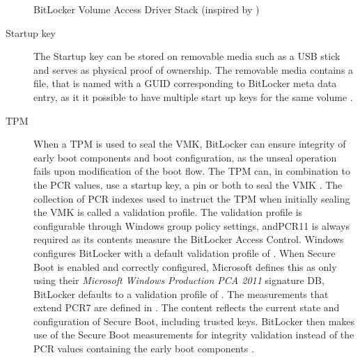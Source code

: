 \begin{figure}[htb]%
    \centering
    
    \caption{BitLocker Volume Access Driver Stack (inspired by \cite[Figure 9-24]{windows-internals-6-part2})}%
    \label{fig:bitlocker-volume-access-driver-stack}%
\end{figure}

\begin{description}
    \item[Startup key] The Startup key can be stored on removable media such as a \ac{USB} stick and serves as physical proof of ownership.
        The removable media contains a  file, that is named with a \ac{GUID} corresponding to BitLocker meta data entry, as it it possible to have multiple start up keys for the same volume \cite[Section 2.6]{bde-format-spec}\cite{microsoft-windows-prepare-your-org}.

    \item[TPM]
        When a \ac{TPM} is used to seal the \ac{VMK}, BitLocker can ensure integrity of early boot components and boot configuration, as the unseal operation fails upon modification of the boot flow.
        The \ac{TPM} can, in combination to the \ac{PCR} values, use a startup key, a pin or both to seal the \ac{VMK} \cite{microsoft-bitlocker-countermeasures}.
        The collection of \ac{PCR} indexes used to instruct the \ac{TPM} when initially sealing the \ac{VMK} is called a validation profile.
        The validation profile is configurable through Windows group policy settings, and\ac{PCR}11 is always required as its contents measure the BitLocker Access Control.
        Windows configures BitLocker with a default validation profile of  \cite{microsoft-windows-bitlocker-group-policy-settings}.
        When Secure Boot is enabled and correctly configured, Microsoft defines this as only using their \emph{Microsoft Windows Production PCA 2011} signature \ac{DB}, BitLocker defaults to a validation profile of  \cite{microsoft-pcr7-binding}.
        The measurements that extend \ac{PCR}7 are defined in \cite{microsoft-trusted-execution-environment}.
        The content reflects the current state and configuration of Secure Boot, including trusted keys.
        BitLocker then makes use of the Secure Boot measurements for integrity validation instead of the \ac{PCR} values containing the early boot components \cite{microsoft-windows-bitlocker-group-policy-settings}.


\end{description}
